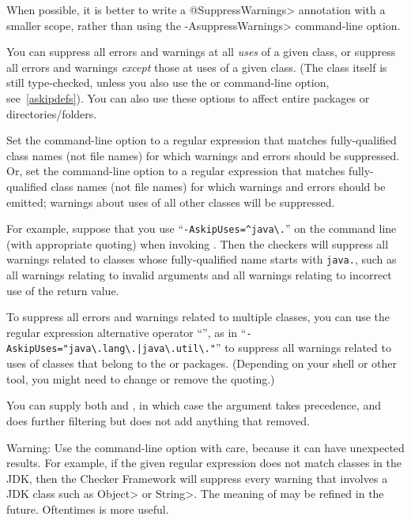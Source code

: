 When possible, it is better to write a \<@SuppressWarnings> annotation with a
smaller scope, rather than using the \<-AsuppressWarnings> command-line option.



You can suppress all errors and warnings at all \emph{uses} of a given
class, or suppress all errors and warnings \emph{except} those at uses of a given
class.  (The class itself is still type-checked, unless you also use
the  or  command-line option, see~\ref{askipdefs}).
You can also use these options to affect entire packages or directories/folders.

Set the  command-line option to a
regular expression that matches fully-qualified class names (not file names) for which warnings and errors
should be suppressed.
Or, set the  command-line option to a
regular expression that matches fully-qualified class names (not file names) for which warnings and errors
should be emitted; warnings about uses of all other classes will be suppressed.

For example, suppose that you use
``{\codesize\verb|-AskipUses=^java\.|}'' on the command line
(with appropriate quoting) when invoking
.  Then the checkers will suppress all warnings related to
classes whose fully-qualified name starts with \codesize\verb|java.|, such
as all warnings relating to invalid arguments and all warnings relating to
incorrect use of the return value.

To suppress all errors and warnings related to multiple classes, you can use
the regular expression alternative operator ``\code{|}'', as in
``{\codesize\verb+-AskipUses="java\.lang\.|java\.util\."+}'' to suppress
all warnings related to uses of classes that belong to the  or
 packages.  (Depending on your shell or other tool, you
might need to change or remove the quoting.)

You can supply both  and , in which case
the  argument takes precedence, and  does
further filtering but does not add anything that  removed.

Warning:  Use the  command-line option with care,
because it can have unexpected results.  For example, if the
given regular expression does not match classes in the JDK, then the
Checker Framework will suppress every warning that involves a JDK class
such as \<Object> or \<String>.  The meaning of  may be
refined in the future.  Oftentimes  is more useful.

